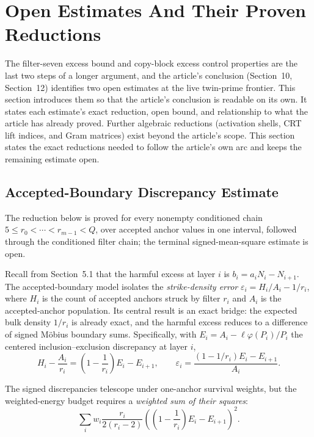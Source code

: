 \section{Open Estimates And Their Proven Reductions}
\label{sec:open-estimates}

The filter-seven excess bound and copy-block excess control properties are the last two steps of a longer argument, and the
article's conclusion (Section~10, Section~12) identifies two open estimates at the live
twin-prime frontier. This section introduces them so that the article's
conclusion is readable on its own. It states each estimate's exact reduction,
open bound, and relationship to what the article has already proved. Further
algebraic reductions (activation shells, CRT lift indices, and Gram matrices)
exist beyond the article's scope. This section states the exact reductions
needed to follow the article's own arc and keeps the remaining estimate open.

\subsection{Accepted-Boundary Discrepancy Estimate}
\label{sec:accepted-boundary-discrepancy}

The reduction below is proved for every nonempty conditioned chain
$5\le r_0<\cdots<r_{m-1}<Q$, over accepted anchor values in one interval,
followed through the conditioned filter chain; the terminal
signed-mean-square estimate is open.

Recall from Section~5.1 that the harmful excess at layer $i$ is
$b_i=a_iN_i-N_{i+1}$. The accepted-boundary model isolates the \emph{strike-density error}
$\varepsilon_i=H_i/A_i-1/r_i$, where $H_i$ is the count of accepted anchors
struck by filter $r_i$ and $A_i$ is the accepted-anchor population. Its
central result is an exact bridge: the expected bulk density $1/r_i$ is
already exact, and the harmful excess reduces to a difference of signed
M\"obius boundary sums. Specifically, with
$E_i=A_i-\ell\varphi(P_i)/P_i$ the centered inclusion--exclusion discrepancy
at layer $i$,
\begin{equation*}
H_i-\frac{A_i}{r_i}
=
\left(1-\frac1{r_i}\right)E_i-E_{i+1},
\qquad
\varepsilon_i
=
\frac{(1-1/r_i)E_i-E_{i+1}}{A_i}.
\end{equation*}

The signed discrepancies telescope under one-anchor survival weights, but the
weighted-energy budget requires a \emph{weighted sum of their squares}:
\begin{equation*}
\sum_i
w_i\frac{r_i}{2(r_i-2)}
\left(\left(1-\frac1{r_i}\right)E_i-E_{i+1}\right)^2.
\end{equation*}

